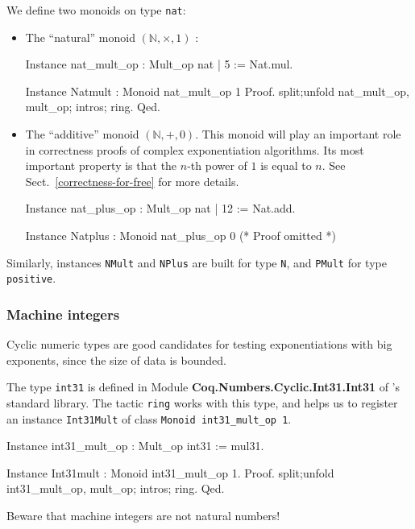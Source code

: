 We define two monoids on type \texttt{nat}:
\begin{itemize}
\item The ``natural'' monoid $(\mathbb{N},\times, 1)$ :

  \begin{Coqsrc}
Instance nat_mult_op : Mult_op nat | 5 := Nat.mul.

Instance  Natmult : Monoid nat_mult_op  1%
Proof.
   split;unfold nat_mult_op, mult_op; intros; ring.
Qed.
\end{Coqsrc}

\item The ``additive''  monoid $(\mathbb{N},+, 0)$.
This monoid will play an important role in correctness proofs of complex
exponentiation algorithms. Its most important property is that the $n$-th 
power of $1$ is equal to $n$. See Sect.~\vref{correctness-for-free} for more details.

\begin{Coqsrc}
Instance nat_plus_op : Mult_op nat | 12 := Nat.add.

Instance Natplus : Monoid nat_plus_op  0%
(* Proof omitted *)
\end{Coqsrc}
\end{itemize}

Similarly, instances \texttt{NMult} and  \texttt{NPlus}  are built for type \texttt{N}, and
\texttt{PMult} for type \texttt{positive}.

\subsubsection{Machine integers}

Cyclic numeric types are  good candidates for testing exponentiations
with big exponents, since the size of data is bounded.

The type \texttt{int31} is defined  in Module
\textbf{Coq.Numbers.Cyclic.Int31.Int31} of \coq's standard library. The tactic \texttt{ring} works 
with this type, and helps us to register an instance \texttt{Int31Mult} of class  \texttt{Monoid int31\_mult\_op 1}.

\begin{Coqsrc}
Instance int31_mult_op : Mult_op int31 := mul31.

Instance  Int31mult : Monoid int31_mult_op  1.
Proof.
   split;unfold int31_mult_op, mult_op; intros; ring.
Qed.
\end{Coqsrc}

Beware that machine integers are not natural numbers! 


